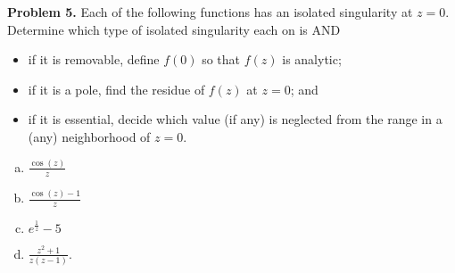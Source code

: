 \documentclass[leqno]{article}
\theoremstyle{nonumberplain}
\begin{document}
\vspace*{1cm}

\noindent\textbf{Problem 5.}  Each of the following functions has an isolated singularity at $z=0$. Determine which type of isolated singularity each on is AND
\begin{itemize}
\item if it is removable, define $f(0)$ so that $f(z)$ is analytic;
\item if it is a pole, find the residue of $f(z)$ at $z=0$; and
\item if it is essential, decide which value (if any) is neglected from the range in a (any) neighborhood of $z=0$.
\end{itemize}

\begin{enumerate}[(a)]
\item $\frac{\cos(z)}{z}$
\item $\frac{\cos(z)-1}{z}$
\item $e^{\frac{1}{z}}-5$
\item $\frac{z^2+1}{z(z-1)}$.
\end{enumerate}
\end{document}
